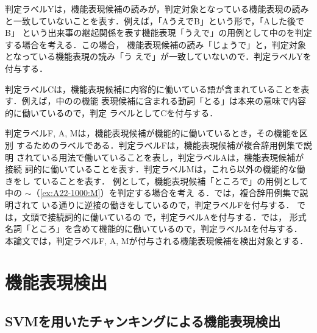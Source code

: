 \documentclass[japanese]{jnlp_1.3e}
\begin{document}
判定ラベルYは，機能表現候補の読みが，判定対象となっている機能表現の読み
と一致していないことを表す．例えば，「AうえでB」という形で，「Aした後でB」
という出来事の継起関係を表す機能表現「うえで」の用例として中のを判定する場合を考える．この場合，
機能表現候補の読み「じょうで」と，判定対象となっている機能表現の読み「う
えで」が一致していないので．判定ラベルYを付与する．

判定ラベルCは，機能表現候補に内容的に働いている語が含まれていることを表
す．例えば，中のの機能
表現候補に含まれる動詞「とる」は本来の意味で内容的に働いているので，判定
ラベルとしてCを付与する．

判定ラベルF, A, Mは，機能表現候補が機能的に働いているとき，その機能を区別
するためのラベルである．判定ラベルFは，機能表現候補が複合辞用例集で説明
されている用法で働いていることを表し，判定ラベルAは，機能表現候補が接続
詞的に働いていることを表す．判定ラベルMは，これら以外の機能的な働きをし
ていることを表す．
例として，機能表現候補「ところで」の用例として中の
$\sim$（\ref{ex:A22-1000:M}）を判定する場合を考え
る．では，複合辞用例集で説明されて
いる通りに逆接の働きをしているので，判定ラベルFを付与する．
では，文頭で接続詞的に働いているの
で，判定ラベルAを付与する．では，
形式名詞「ところ」を含めて機能的に働いているので，判定ラベルMを付与する．
本論文では，判定ラベルF, A, Mが付与される機能表現候補を検出対象とする．







\section{機能表現検出}\label{sec:chunker}

\subsection{SVMを用いたチャンキングによる機能表現検出}
\label{sec:chunking_using_svm}
\end{document}
